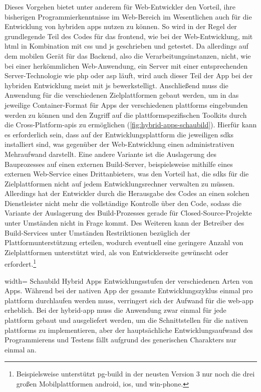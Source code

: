 Dieses Vorgehen bietet unter anderem für Web-Entwickler den Vorteil, ihre bisherigen Programmierkenntnisse im Web-Bereich im Wesentlichen auch für die Entwicklung von hybriden \glspl{app} nutzen zu können. 
So wird in der Regel der grundlegende Teil des Codes für das \gls{frontend}, wie bei der Web-Entwicklung, mit \gls{html} in Kombination mit \gls{css} und \gls{js} geschrieben und getestet. 
Da allerdings auf dem mobilen Gerät für das Backend, also die Verarbeitungsinstanzen, nicht, wie bei einer herkömmlichen Web-Anwendung, ein Server mit einer entsprechenden Server-Technologie wie \gls{php} oder \gls{asp} läuft, wird auch dieser Teil der App bei der hybriden Entwicklung meist mit \gls{js} bewerkstelligt. 
Anschließend muss die Anwendung für die verschiedenen Zielplattformen gebaut werden, um in das jeweilige Container-Format für Apps der verschiedenen \glspl{plattform} eingebunden werden zu können und den Zugriff auf die plattformspezifischen Toolkits durch die Cross-Platform-\glspl{api} zu ermöglichen (\autoref{fig:hybrid-apps-schaubild}).
Hierfür kann es erforderlich sein, dass auf der Entwicklungsplattform die jeweiligen \glspl{sdk} installiert sind, was gegenüber der Web-Entwicklung einen administrativen Mehraufwand darstellt.
Eine andere Variante ist die Auslagerung des Bauprozesses auf einen externen Build-Server, beispielsweise mithilfe eines externen Web-Service eines Dritt\-an\-bie\-ters, was den Vorteil hat, die \glspl{sdk} für die Zielplattformen nicht auf jedem Entwicklungsrechner verwalten zu müssen. 
Allerdings hat der Entwickler durch die Herausgabe des Codes an einen solchen Dienstleister nicht mehr die vollständige Kontrolle über den Code, sodass die Variante der Auslagerung des Build-Prozesses gerade für Closed-Source-Projekte unter Umständen nicht in Frage kommt. 
Des Weiteren kann der Betreiber des Build-Services unter Umständen Restriktionen bezüglich der Plattformunterstützung erteilen, wodurch eventuell eine geringere Anzahl von Zielplattformen unterstützt wird, als von Entwicklerseite gewünscht oder erfordert.\footnote{Beispielsweise unterstützt \gls{pg-build} in der neusten Version 3 nur noch die drei großen Mobilplattformen \gls{android}, \gls{ios}, und \gls{win-phone}.}

	{width=\fullimagesize}
	{Schaubild Hybrid Apps}
		{Entwicklungsstufen der verschiedenen Arten von Apps. Während bei der nativen App der gesamte Entwicklungszyklus einmal pro \gls{plattform} durchlaufen werden muss, verringert sich der Aufwand für die \gls{web-app} erheblich. Bei der \gls{hybrid-app} muss die Anwendung zwar einmal für jede \gls{plattform} gebaut und ausgeliefert werden, um die Schnittstellen für die nativen \glspl{plattform} zu implementieren, aber der hauptsächliche Entwicklungsaufwand des Programmierens und Testens fällt aufgrund des generischen Charakters nur einmal an.}
	{}

